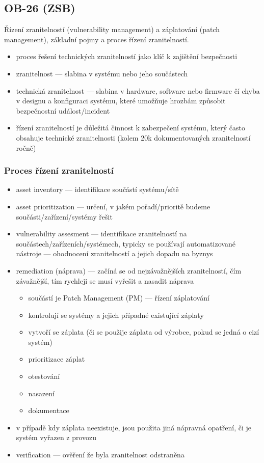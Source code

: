 \subsection{OB-26 (ZSB)}
Řízení zranitelností (vulnerability management) a záplatování (patch management), základní pojmy a proces řízení zranitelností.

\begin{itemize}
	\item proces řešení technických zranitelností jako klíč k zajištění bezpečnosti
	\item zranitelnost --- slabina v systému nebo jeho součástech
	\item technická zranitelnost --- slabina v hardware, software nebo firmware čí chyba v designu a konfiguraci systému, které umožňuje hrozbám způsobit bezpečnostní událost/incident
	\item řízení zranitelností je důležitá činnost k zabezpečení systému, který často obsahuje technické zranitelnosti (kolem 20k dokumentovaných zranitelností ročně)
\end{itemize}

\subsubsection*{Proces řízení zranitelností}
\begin{itemize}
	\item asset inventory --- identifikace součástí systému/sítě
	\item asset prioritization --- určení, v jakém pořadí/prioritě budeme součásti/zařízení/systémy řešit
	\item vulnerability assesment --- identifikace zranitelností na součástech/zařízeních/systémech, typicky se po\-uží\-va\-jí automatizované nástroje --- ohodnocení zranitelností a jejich dopadu na byznys
	\item remediation (náprava) --- začíná se od nejzávažnějších zranitelností, čím závažnější, tím rychleji se musí vyřešit a nasadit náprava
	\begin{itemize}
		\item součástí je Patch Management (PM) --- řízení záplatování
		\item kontrolují se systémy a jejich případné existující záplaty
		\item vytvoří se záplata (či se použije záplata od výrobce, pokud se jedná o cizí systém)
		\item prioritizace záplat
		\item otestování
		\item nasazení
		\item dokumentace
	\end{itemize}
	\item v případě kdy záplata neexistuje, jsou použita jiná nápravná opatření, či je systém vyřazen z provozu
	\item verification --- ověření že byla zranitelnost odstraněna
\end{itemize}

